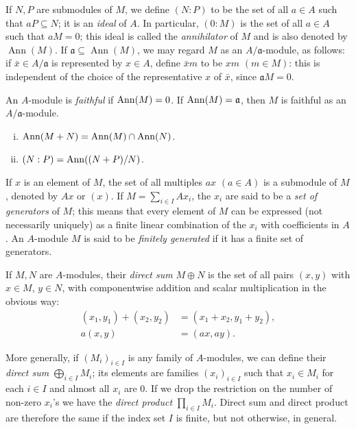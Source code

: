 If $N, P$ are submodules of $M$, we define $(N : P)$ to be the set of all $a \in A$ such that $aP \subseteq N$; it is an \emph{ideal} of $A$. In particular, $(0 : M)$ is the set of all $a \in A$ such that $aM = 0$; this ideal is called the \emph{annihilator} of $M$ and is also denoted by $\operatorname{Ann}(M)$. If $\mathfrak{a} \subseteq \operatorname{Ann}(M)$, we may regard $M$ as an $A/\mathfrak{a}$-module, as follows: if $\bar{x} \in A/\mathfrak{a}$ is represented by $x \in A$, define $\bar{x}m$ to be $xm$ $(m \in M)$: this is independent of the choice of the representative $x$ of $\bar{x}$, since $\mathfrak{a}M = 0$.

An $A$-module is \emph{faithful} if $\operatorname{Ann}(M) = 0$. If $\operatorname{Ann}(M) = \mathfrak{a}$, then $M$ is faithful as an $A/\mathfrak{a}$-module.

\begin{exercise}\label{ex:annihilator-properties}
\begin{enumerate}[i)]
    \item $\operatorname{Ann}(M + N) = \operatorname{Ann}(M) \cap \operatorname{Ann}(N)$.
    \item $(N:P) = \operatorname{Ann}((N + P)/N)$.
\end{enumerate}
\end{exercise}

If $x$ is an element of $M$, the set of all multiples $ax$ $(a \in A)$ is a submodule of $M$, denoted by $Ax$ or $(x)$. If $M = \sum_{i \in I} Ax_i$, the $x_i$ are said to be a \emph{set of generators} of $M$; this means that every element of $M$ can be expressed (not necessarily uniquely) as a finite linear combination of the $x_i$ with coefficients in $A$. An $A$-module $M$ is said to be \emph{finitely generated} if it has a finite set of generators.

If $M, N$ are $A$-modules, their \emph{direct sum} $M \oplus N$ is the set of all pairs $(x, y)$ with $x \in M$, $y \in N$, with componentwise addition and scalar multiplication in the obvious way:
\begin{align*}
    (x_1, y_1) + (x_2, y_2) &= (x_1 + x_2, y_1 + y_2), \\
    a(x, y) &= (ax, ay).
\end{align*}

More generally, if $(M_i)_{i \in I}$ is any family of $A$-modules, we can define their \emph{direct sum} $\bigoplus_{i \in I} M_i$; its elements are families $(x_i)_{i \in I}$ such that $x_i \in M_i$ for each $i \in I$ and almost all $x_i$ are $0$. If we drop the restriction on the number of non-zero $x_i$'s we have the \emph{direct product} $\prod_{i \in I} M_i$. Direct sum and direct product are therefore the same if the index set $I$ is finite, but not otherwise, in general.

